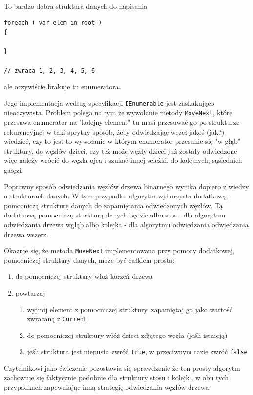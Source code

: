 To bardzo dobra struktura danych do napisania 

\begin{scriptsize}
\begin{verbatim}
foreach ( var elem in root ) 
{

}

// zwraca 1, 2, 3, 4, 5, 6
\end{verbatim}
\end{scriptsize}

ale oczywiście brakuje tu enumeratora. 

Jego implementacja według specyfikacji {\tt IEnumerable} jest zaskakująco nieoczywista. Problem polega na tym 
że wywołanie metody {\tt MoveNext}, które przesuwa enumerator na "kolejny element" tu musi przesuwać go po strukturze
rekurencyjnej w taki sprytny sposób, żeby odwiedzając węzeł jakoś (jak?) wiedzieć, czy to jest to wywołanie w którym
enumerator przesunie się "w głąb" struktury, do węzłów-dzieci, czy też może węzły-dzieci już zostały odwiedzone więc
należy wrócić do węzła-ojca i szukać innej scieżki, do kolejnych, sąsiednich gałęzi.

Poprawny sposób odwiedzania węzłów drzewa binarnego wynika dopiero z wiedzy o strukturach danych. W tym przypadku
algorytm wykorzysta dodatkową, pomocniczą strukturę danych do zapamiętania odwiedzonych węzłów. Tą dodatkową pomocniczą
sturkturą danych będzie albo stos - dla algorytmu odwiedzania drzewa wgłąb albo kolejka - dla algorytmu odwiedzania 
odwiedzania drzewa wszerz.

Okazuje się, że metoda {\tt MoveNext} implementowana przy pomocy dodatkowej, 
pomocniczej struktury danych, może być całkiem prosta:

\begin{enumerate}
\item do pomocniczej struktury włoż korzeń drzewa
\item powtarzaj
    \begin{enumerate}
    \item wyjmij element z pomocniczej struktury, zapamiętaj go jako wartość zwracaną z {\tt Current}
    \item do pomocniczej struktury włóż dzieci zdjętego węzła (jeśli istnieją)
    \item jeśli struktura jest niepusta zwróć {\tt true}, w przeciwnym razie zwróć {\tt false}
    \end{enumerate}
\end{enumerate}

Czytelnikowi jako ćwiczenie pozostawia się sprawdzenie że ten prosty algorytm zachowuje się faktycznie podobnie
dla struktury stosu i kolejki, w obu tych przypadkach zapewniając inną strategię odwiedzania węzłów drzewa.

